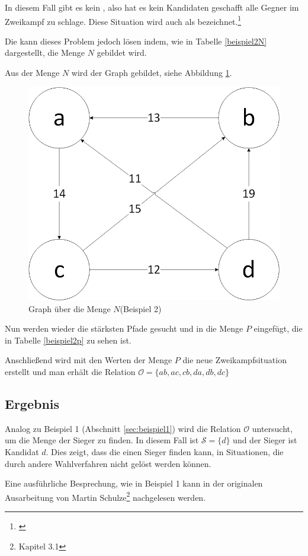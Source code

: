 In diesem Fall gibt es kein \condorcetSieger, also hat es kein Kandidaten geschafft alle Gegner im Zweikampf zu schlage.  Diese Situation wird auch als  \condorcetParadox bezeichnet.\footnote{\Vgl \citet{EnricoSchoebel2018}}

\newpage
Die \schulze kann dieses Problem jedoch lösen indem, wie in Tabelle \ref{beispiel2N} dargestellt, die Menge $N$ gebildet wird.



Aus der Menge $N$ wird der Graph gebildet, siehe Abbildung \ref{fig:graph2}.

\begin{figure}[!h]
\centering
\includegraphics[scale=0.5]{Bilder/Beispiel2_Graph.png}
\caption{Graph über die Menge $N$(Beispiel 2)}
\label{fig:graph2}
\end{figure}

Nun werden wieder die stärksten Pfade gesucht und in die Menge $P$ eingefügt, die in Tabelle \ref{beispiel2p} zu sehen ist.



Anschließend wird mit den Werten der Menge $P$ die neue Zweikampfsituation erstellt und man erhält die Relation $\mathcal{O} = \{ ab,ac,cb,da,db,dc \}$


\subsection{Ergebnis} 
\label{sec:ergebnis2}
Analog zu Beispiel 1 (Abschnitt \ref{sec:beispiel1}) wird die Relation $\mathcal{O}$ untersucht, um die Menge der Sieger zu finden. In diesem Fall ist $\mathcal{S}=\{d\}$  und der Sieger ist Kandidat $d$. Dies zeigt, dass die \schulze einen Sieger finden kann, in Situationen, die durch andere Wahlverfahren nicht gelöst werden können.

Eine ausführliche Besprechung, wie in Beispiel 1 kann in der originalen Ausarbeitung von Martin Schulze\footnote{\Vgl \citet{Schulze2017} Kapitel 3.1} nachgelesen werden.
